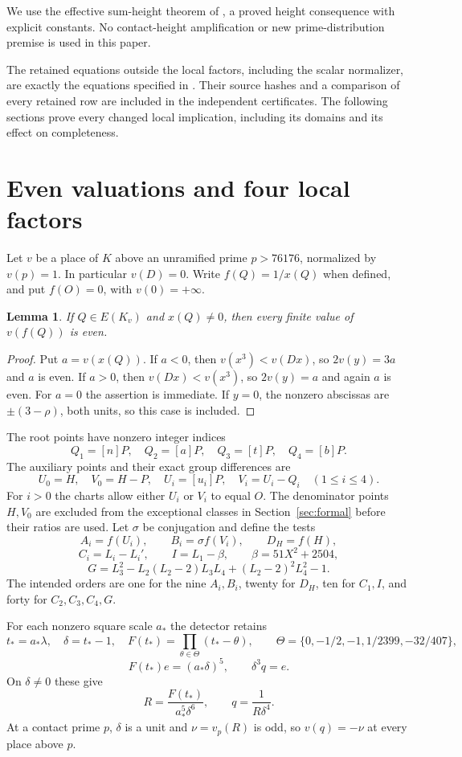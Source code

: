 \documentclass[11pt,a4paper]{article}
\newtheorem{lemma}[theorem]{Lemma}
\theoremstyle{remark}\newtheorem{remark}[theorem]{Remark}
\begin{document}
We use the effective sum-height theorem of \cite{Sums}, a proved
height consequence with explicit constants. No contact-height amplification or new
prime-distribution premise is used in this paper.

The retained equations outside the local factors, including the scalar
normalizer, are exactly the equations specified in
\cite{Shared,Explicit}. Their source hashes and a comparison
of every retained row are included in the independent certificates.
The following sections prove every changed local implication, including
its domains and its effect on completeness.

\section{Even valuations and four local factors}
Let $v$ be a place of $K$ above an unramified prime $p>76176$,
normalized by $v(p)=1$. In particular $v(D)=0$. Write $f(Q)=1/x(Q)$
when defined, and put $f(O)=0$, with $v(0)=+\infty$.

\begin{lemma}\label{lem:even}
If $Q\in E(K_v)$ and $x(Q)\ne0$, then every finite value of
$v(f(Q))$ is even.
\end{lemma}
\begin{proof}
Put $a=v(x(Q))$. If $a<0$, then $v(x^3)<v(Dx)$, so
$2v(y)=3a$ and $a$ is even. If $a>0$, then
$v(Dx)<v(x^3)$, so $2v(y)=a$ and again $a$ is even.
For $a=0$ the assertion is immediate. If $y=0$, the nonzero abscissas
are $\pm(3-\rho)$, both units, so this case is included.
\end{proof}

The root points have nonzero integer indices
\[
 Q_1=[n]P,\quad Q_2=[a]P,\quad Q_3=[t]P,\quad Q_4=[b]P.
\]
The auxiliary points and their exact group differences are
\[
 U_0=H,\quad V_0=H-P,\quad U_i=[u_i]P,\quad
 V_i=U_i-Q_i\quad(1\le i\le4).
\]
For $i>0$ the charts allow either $U_i$ or $V_i$ to equal $O$.
The denominator points $H,V_0$ are excluded from the exceptional
classes in Section~\ref{sec:formal} before their ratios are used.
Let $\sigma$ be conjugation and define the tests
\[
 A_i=f(U_i),\qquad B_i=\sigma f(V_i),\qquad D_H=f(H),
\]
\[
 C_i=L_i-L_i',\qquad I=L_1-\beta,\qquad \beta=51X^2+2504,
\]
\[
 G=L_3^2-L_2(L_2-2)L_3L_4+(L_2-2)^2L_4^2-1.
\]
The intended orders are one for the nine $A_i,B_i$, twenty for
$D_H$, ten for $C_1,I$, and forty for $C_2,C_3,C_4,G$.

For each nonzero square scale $a_*$ the detector retains
\[
 t_*=a_*\lambda,\quad \delta=t_*-1,\quad
 F(t_*)=\prod_{\theta\in\Theta}(t_*-\theta),\qquad
 \Theta=\{0,-1/2,-1,1/2399,-32/407\},
\]
\begin{equation}\label{eq:clearedweights}
 F(t_*)e=(a_*\delta)^5,\qquad \delta^3q=e.
\end{equation}
On $\delta\ne0$ these give
\[
 R=\frac{F(t_*)}{a_*^5\delta^6},\qquad q=\frac1{R\delta^4}.
\]
At a contact prime $p$, $\delta$ is a unit and $\nu=v_p(R)$ is odd,
so $v(q)=-\nu$ at every place above $p$.
\end{document}
